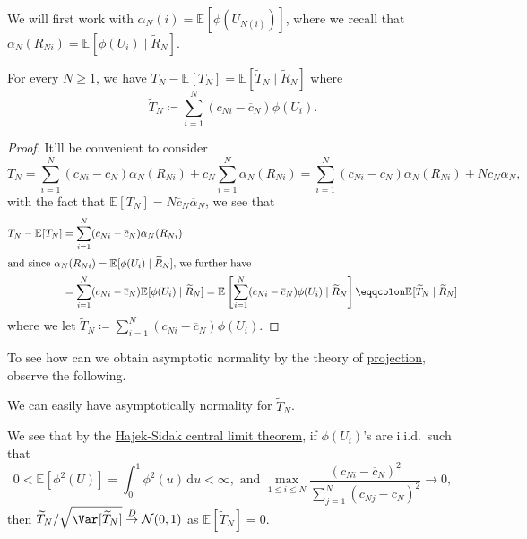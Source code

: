 We will first work with \(\alpha _N(i) = \mathbb{E}_{}[\phi (U_{N(i)})] \), where we recall that \(\alpha _N(R_{Ni}) = \mathbb{E}_{}[\phi (U_i) \mid \widetilde{R} _N]\).

\begin{proposition}
	For every \(N \geq 1\), we have \(T_N - \mathbb{E}_{}[T_N] = \mathbb{E}_{}[\widetilde{T} _N \mid \widetilde{R} _N] \) where
	\[
		\widetilde{T} _N
		\coloneqq \sum_{i=1}^{N} (c_{Ni} - \overline{c} _N) \phi (U_i).
	\]
\end{proposition}
\begin{proof}
	It'll be convenient to consider
	\[
		T_N
		= \sum_{i=1}^{N} (c_{Ni} - \overline{c} _N) \alpha _N(R_{Ni}) + \overline{c} _N \sum_{i=1}^{N} \alpha _N(R_{Ni})
		= \sum_{i=1}^{N} (c_{Ni} - \overline{c} _N) \alpha _N(R_{Ni}) + N \overline{c} _N \overline{\alpha} _N,
	\]
	with the fact that \(\mathbb{E}_{}[T_N] = N \overline{c} _N \overline{\alpha} _N\), we see that
	\begin{align*}
		T_N - \mathbb{E}_{}[T_N]
		 & = \sum_{i=1}^{N} (c_{Ni} - \overline{c} _N) \alpha _N(R_{Ni})                               \\
		\shortintertext{and since \(\alpha _N(R_{Ni}) = \mathbb{E}_{}[\phi (U_i) \mid \widetilde{R} _N]\), we further have}
		 & = \sum_{i=1}^{N} (c_{Ni} - \overline{c} _N) \mathbb{E}_{}[\phi (U_i) \mid \widetilde{R} _N]
		= \mathbb{E}_{}\left[\sum_{i=1}^{N} (c_{Ni} - \overline{c} _N) \phi (U_i) \mid \widetilde{R} _N\right]
		\eqqcolon \mathbb{E}_{}[\widetilde{T} _N \mid \widetilde{R} _N]
	\end{align*}
	where we let \(\widetilde{T} _N \coloneqq \sum_{i=1}^{N} (c_{Ni} - \overline{c} _N) \phi (U_i)\).
\end{proof}

To see how can we obtain asymptotic normality by the theory of \hyperref[def:projection]{projection}, observe the following.

\begin{claim}\label{clm:simple-linear-rank-statistic-asymptotic-normality}
	We can easily have asymptotically normality for \(\widetilde{T} _N\).
\end{claim}
\begin{explanation}
	We see that by the \hyperref[thm:Hajek-Sidak-CLT]{Hajek-Sidak central limit theorem}, if \(\phi (U_i)\)'s are i.i.d.\ such that
	\[
		0 < \mathbb{E}_{}[\phi ^2(U)] = \int_{0}^{1} \phi ^2(u) \,\mathrm{d}u < \infty, \text{ and }
		\max _{1 \leq i \leq N} \frac{(c_{Ni} - \overline{c} _N)^2}{\sum_{j=1}^{N} (c_{Nj} - \overline{c} _N)^2} \to 0,
	\]
	then \(\widetilde{T} _N / \sqrt{\Var_{}[\widetilde{T} _N] } \overset{D}{\to} \mathcal{N} (0, 1)\) as \(\mathbb{E}_{}[\widetilde{T} _N] = 0 \).
\end{explanation}

